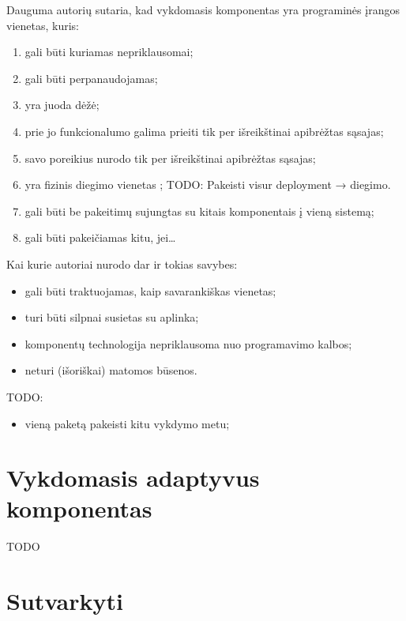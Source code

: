 Dauguma autorių sutaria, kad vykdomasis komponentas yra programinės
įrangos vienetas, kuris:
\begin{enumerate}
  \item \label{com:exe:independent} gali būti kuriamas nepriklausomai;
  \item \label{com:exe:reusable} gali būti perpanaudojamas;
  \item \label{com:exe:blackbox} yra juoda dėžė;
  \item \label{com:exe:interfaceprovider} prie jo funkcionalumo galima
    prieiti tik per išreikštinai apibrėžtas sąsajas;
  \item \label{com:exe:interfaceuser} savo poreikius nurodo tik per
    išreikštinai apibrėžtas sąsajas;
  \item \label{com:exe:deployment} yra fizinis diegimo vienetas
    ;
    TODO: Pakeisti visur deployment → diegimo.
  \item \label{com:exe:composed} gali būti be pakeitimų sujungtas su
    kitais komponentais į vieną sistemą;
  \item \label{com:exe:interchangable} gali būti pakeičiamas kitu, jei…
\end{enumerate}

Kai kurie autoriai nurodo dar ir tokias savybes:
\begin{itemize}
  \item gali būti traktuojamas, kaip savarankiškas vienetas;
  \item turi būti silpnai susietas su aplinka;
  \item komponentų technologija nepriklausoma nuo programavimo kalbos;
  \item neturi (išoriškai) matomos būsenos.
\end{itemize}

TODO:
\begin{itemize}
  \item vieną paketą pakeisti kitu vykdymo metu;
\end{itemize}

\section{Vykdomasis adaptyvus komponentas}

TODO

\section{Sutvarkyti}

